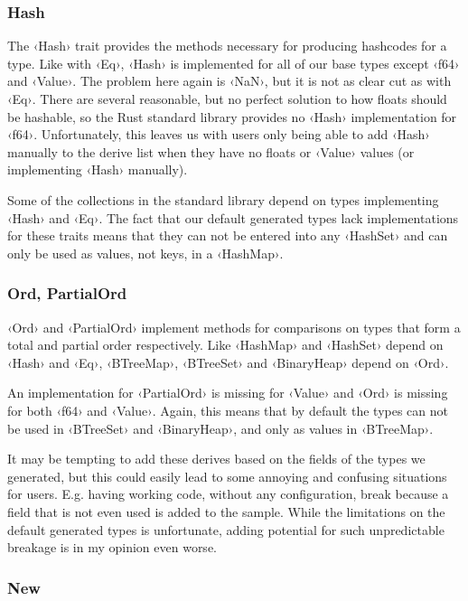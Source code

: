 \subsubsection{Hash}

The ‹Hash› trait provides the methods necessary for producing hashcodes for a type. Like with ‹Eq›, ‹Hash› is implemented for all of our base types except ‹f64› and ‹Value›. The problem here again is ‹NaN›, but it is not as clear cut as with ‹Eq›. There are several reasonable, but no perfect solution to how floats should be hashable, so the Rust standard library provides no ‹Hash› implementation for ‹f64›. Unfortunately, this leaves us with users only being able to add ‹Hash› manually to the derive list when they have no floats or ‹Value› values (or implementing ‹Hash› manually).

Some of the collections in the standard library depend on types implementing ‹Hash› and ‹Eq›. The fact that our default generated types lack implementations for these traits means that they can not be entered into any ‹HashSet› and can only be used as values, not keys, in a ‹HashMap›.

\subsubsection{Ord, PartialOrd}

‹Ord› and ‹PartialOrd› implement methods for comparisons on types that form a total and partial order respectively. Like ‹HashMap› and ‹HashSet› depend on ‹Hash› and ‹Eq›, ‹BTreeMap›, ‹BTreeSet› and ‹BinaryHeap› depend on ‹Ord›.

An implementation for ‹PartialOrd› is missing for ‹Value› and ‹Ord› is missing for both ‹f64› and ‹Value›. Again, this means that by default the types can not be used in ‹BTreeSet› and ‹BinaryHeap›, and only as values in ‹BTreeMap›.

It may be tempting to add these derives based on the fields of the types we generated, but this could easily lead to some annoying and confusing situations for users. E.g. having working code, without any configuration, break because a field that is not even used is added to the sample. While the limitations on the default generated types is unfortunate, adding potential for such unpredictable breakage is in my opinion even worse.

\subsubsection{New}

